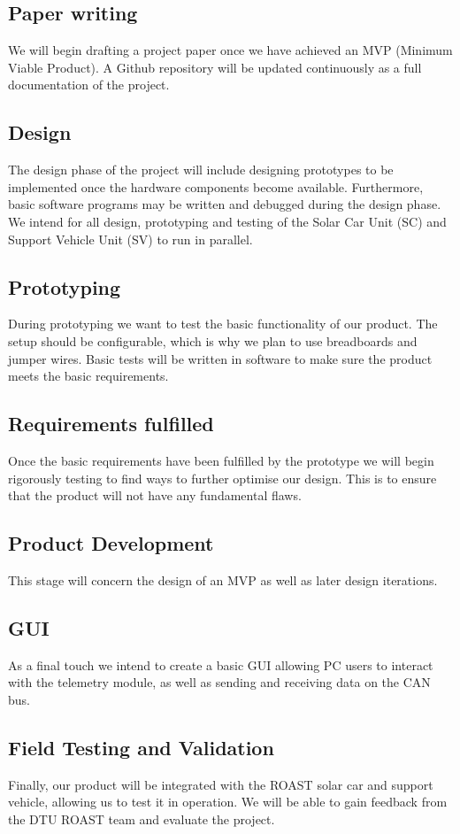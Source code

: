 \documentclass[]{article}
\begin{document}
\subsection*{Paper writing}
We will begin drafting a project paper once we have achieved an MVP (Minimum Viable Product). A Github repository will be updated continuously as a full documentation of the project.
\subsection*{Design}
The design phase of the project will include designing prototypes to be implemented once the hardware components become available. Furthermore, basic software programs may be written and debugged during the design phase. We intend for all design, prototyping and testing of the Solar Car Unit (SC) and Support Vehicle Unit (SV) to run in parallel. 
\subsection*{Prototyping}
During prototyping we want to test the basic functionality of our product. The setup should be configurable, which is why we plan to use breadboards and jumper wires. Basic tests will be written in software to make sure the product meets the basic requirements. 
\subsection*{Requirements fulfilled}
Once the basic requirements have been fulfilled by the prototype we will begin rigorously testing to find ways to further optimise our design. This is to ensure that the product will not have any fundamental flaws. 
\subsection*{Product Development}
This stage will concern the design of an MVP as well as later design iterations. 
\subsection*{GUI}
As a final touch we intend to create a basic GUI allowing PC users to interact with the telemetry module, as well as sending and receiving data on the CAN bus. 
\subsection*{Field Testing and Validation}
Finally, our product will be integrated with the ROAST solar car and support vehicle, allowing us to test it in operation. We will be able to gain feedback from the DTU ROAST team and evaluate the project. 
\newpage
\end{document}
